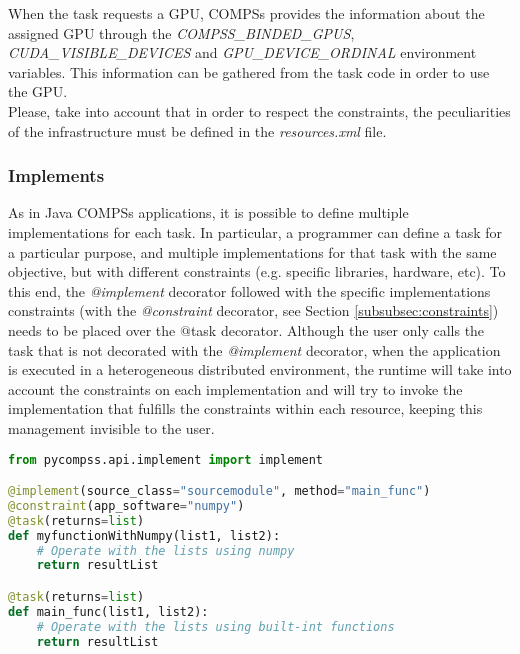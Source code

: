 When the task requests a GPU, COMPSs provides the information about the assigned GPU through the {\it COMPSS\_BINDED\_GPUS}, {\it CUDA\_VISIBLE\_DEVICES} and {\it GPU\_DEVICE\_ORDINAL} environment variables.
This information can be gathered from the task code in order to use the GPU. \\

Please, take into account that in order to respect the constraints, the peculiarities of the infrastructure must be defined in the {\it resources.xml} file.


\subsubsection{Implements}

As in Java COMPSs applications, it is possible to define multiple implementations for each task.
In particular, a programmer can define a task for a particular purpose, and multiple implementations for that task
with the same objective, but with different constraints (e.g. specific libraries, hardware, etc). 
To this end, the {\it @implement} decorator followed with the specific implementations constraints (with the 
{\it @constraint} decorator, see Section \ref{subsubsec:constraints}) needs to be placed over the $@$task decorator.
Although the user only calls the task that is not decorated with the {\it @implement} decorator, when the application 
is executed in a heterogeneous distributed environment, the runtime will take into account the constraints on each 
implementation  and will try to invoke the implementation that fulfills the constraints within each resource, 
keeping this management invisible to the user.


\begin{lstlisting}[language=python]
from pycompss.api.implement import implement

@implement(source_class="sourcemodule", method="main_func")
@constraint(app_software="numpy")
@task(returns=list)
def myfunctionWithNumpy(list1, list2):
    # Operate with the lists using numpy
    return resultList

@task(returns=list)
def main_func(list1, list2):
    # Operate with the lists using built-int functions
    return resultList
\end{lstlisting}

